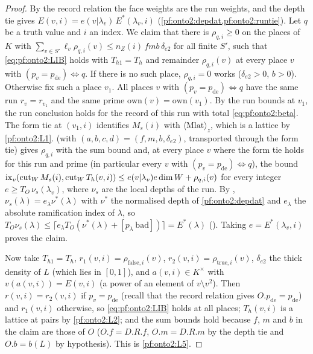 \begin{proof}
By the record relation the face weights are the run weights, and the depth tie gives $E(v,i)=e(v|\lambda_v)\,E^{*}(\lambda_v,i)$
(\cref{pf:onto2:depdat,pf:onto2:runtie}). Let $q$ be a truth value and $i$ an index. We claim that there is $\rho_{q,i}\ge0$ on the
places of $K$ with $\sum_{v\in S'}\ell_v\rho_{q,i}(v)\le n_Z(i)\,fmb\,\delta_{e2}$ for all finite $S'$, such that
\eqref{eq:pf:onto2:LIB} holds with $T_{h1}=T_h$ and remainder $\rho_{q,i}(v)$ at every place $v$ with
$(p_v=p_{\mathrm{de}})\Leftrightarrow q$. If there is no such place, $\rho_{q,i}=0$ works ($\delta_{e2}>0$, $b>0$). Otherwise fix such a
place $v_1$. All places $v$ with $(p_v=p_{\mathrm{de}})\Leftrightarrow q$ have the same run $r_v=r_{v_1}$ and the
same prime $\mathrm{own}(v)=\mathrm{own}(v_1)$. By the run bounds at $v_1$, the run conclusion holds for the record of this run with total
\eqref{eq:pf:onto2:beta}. The form tie at $(v_1,i)$ identifies $M_s(i)$ with $\langle\mathrm{Mlat}\rangle_z$, which is a lattice by
\ref{pf:onto2:L1}.  (with $(a,b,c,d)=(f,m,b,\delta_{e2})$, transported through the form tie) gives $\rho_{q,i}$ with the sum bound and, at every place $v$ where the form tie holds for
this run and prime (in particular every $v$ with $(p_v=p_{\mathrm{de}})\Leftrightarrow q$), the bound
$\operatorname{ix}_v(\operatorname{cut}_WM_s(i),\operatorname{cut}_WT_h(v,i))\le e(v|\lambda_v)e\dim W+\rho_{q,i}(v)$ for every integer $e\ge
T_O\,\nu_s(\lambda_v)$, where $\nu_s$ are the local depths of the run. By
, $\nu_s(\lambda)=e_\lambda\nu^*(\lambda)$ with $\nu^*$ the normalised
depth of \cref{pf:onto2:depdat} and $e_\lambda$ the absolute ramification index of $\lambda$, so $T_O\nu_s(\lambda)\le\lceil e_\lambda
T_O(\nu^*(\lambda)+[p_\lambda\ \text{bad}])\rceil=E^{*}(\lambda)$ (). Taking
$e=E^{*}(\lambda_v,i)$ proves the claim.

Now take $T_{h1}=T_h$, $r_1(v,i)=\rho_{\mathrm{false},i}(v)$, $r_2(v,i)=\rho_{\mathrm{true},i}(v)$, $\delta_{e2}$ the thick density of $L$
(which lies in $[0,1]$), and $a(v,i)\in K^\times$ with $v(a(v,i))=E(v,i)$
(a power of an element of $v\setminus v^2$). Then $r(v,i)=r_2(v,i)$ if $p_v=p_{\mathrm{de}}$ (recall that the
record relation gives $O.p_{\mathrm{de}}=p_{\mathrm{de}}$) and $r_1(v,i)$ otherwise, so \eqref{eq:pf:onto2:LIB} holds at all places;
$T_h(v,i)$ is a lattice at pairs by \ref{pf:onto2:L2}; and the sum bounds hold because $f$, $m$ and $b$ in the claim are those of $O$
($O.f=D.R.f$, $O.m=D.R.m$ by the depth tie and $O.b=b(L)$ by hypothesis). This is \ref{pf:onto2:L5}.
\end{proof}

